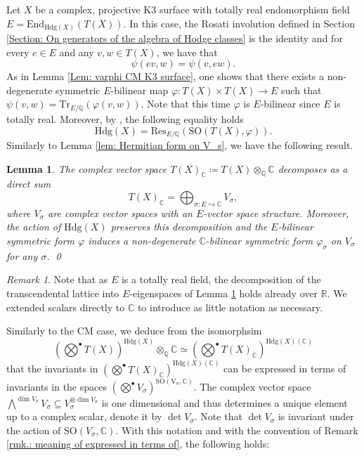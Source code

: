 \documentclass[11pt,twoside,a4paper]{amsart}
\newcommand{\0}{\mathscr{O}}
\newcommand{\R}{\mathbb{R}}
\newcommand{\Q}{\mathbb{Q}}
\newcommand{\C}{\mathbb{C}}
\newcommand{\s}{\sigma}
\theoremstyle{plain}
\newtheorem{lem}[thm]{Lemma}
\theoremstyle{definition}
\theoremstyle{remark}
\newtheorem{rmk}[thm]{Remark}
\begin{document}
\smallskip

Let $X$ be a complex, projective K3 surface with totally real endomorphism field $E= \mathrm{End}_{\mathrm{Hdg}(X)}(T(X))$. In this case, the Rosati involution defined in Section \ref{Section: On generators of the algebra of Hodge classes} is the identity and for every $e\in E$ and any $v, w\in T(X)$, we have that
\[\psi(ev,w)=\psi(v,ew).\]
As in Lemma \ref{Lem: varphi CM K3 surface}, one shows that there exists a non-degenerate symmetric $E$-bilinear map $\varphi\colon T(X)\times T(X)\rightarrow E$ such that $\psi(v,w)=\mathrm{Tr}_{E/\Q}(\varphi(v,w))$. Note that this time $\varphi$ is $E$-bilinear since $E$ is totally real. Moreover, by \cite[Thm.\ 2.2.1]{zarhin1983hodge}, the following equality holds
\[
\mathrm{Hdg}(X)=\mathrm{Res}_{E/\Q}(\mathrm{SO}(T(X),\varphi)).
\]
Similarly to Lemma \ref{lem: Hermitian form on V_s}, we have the following result.
\begin{lem}
\label{lem: Symmetric form on V_s}
The complex vector space $T(X)_\C\coloneqq T(X)\otimes_{\Q}\C$ decomposes as a direct sum 
\[T(X)_\C=\displaystyle\bigoplus_{\sigma\colon E\hookrightarrow \C}V_\s,\]
where $V_\s$ are complex vector spaces with an $E$-vector space structure. Moreover, the action of $\mathrm{Hdg}(X)$ preserves this decomposition and the $E$-bilinear symmetric form $\varphi$ induces a non-degenerate $\C$-bilinear symmetric form $\varphi_\s$ on $V_\s$ for any $\s$. 
\qed
\end{lem}
\begin{rmk}
Note that as $E$ is a totally real field, the decomposition of the transcendental lattice into $E$-eigenspaces of Lemma \ref{lem: Symmetric form on V_s} holds already over $\R$. We extended scalars directly to $\C$ to introduce as little notation as necessary.
\end{rmk}
Similarly to the CM case, we deduce from the isomorphsim
\[
\textstyle(\bigotimes^{\bullet}T(X))^{\mathrm{Hdg}(X)}\otimes_\Q\C\simeq \textstyle(\bigotimes^{\bullet}T(X)_\C)^{\mathrm{Hdg}(X)(\C)}
\]
that the invariants in $\textstyle(\bigotimes^{\bullet}T(X)_\C)^{\mathrm{Hdg}(X)(\C)}$ can be expressed in terms of invariants in the spaces $\left(\bigotimes^{\bullet}V_\s\right)^{\mathrm{SO(V_\s,\C)}}$. 
The complex vector space $\bigwedge^{\dim V_\s}V_\s\subseteq V_\s^{\otimes\dim V_\s}$ is one dimensional and thus determines a unique element up to a complex scalar, denote it by $\det V_\s$. Note that $\det V_\s$ is invariant under the action of $\mathrm{SO}(V_\s,\C)$.
With this notation and with the convention of Remark \ref{rmk.: meaning of expressed in terms of}, the following holds:
\end{document}
